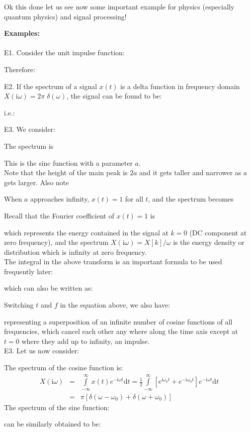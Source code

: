 	Ok this done let us see now some important example for physics (especially quantum physics) and signal processing!
	\begin{tcolorbox}[colframe=black,colback=white,sharp corners]
	\textbf{{\Large {}}Examples:}\\\\
	E1. Consider the unit impulse function:
	
	Therefore:
	
	E2. If the spectrum of a signal $x(t)$ is a delta function in frequency domain $X(\mathrm{i}\omega)=2\pi\;\delta(\omega)$, the signal can be found to be:
	
	i.e.:
	
	E3. We consider:
	
	The spectrum is
	
	This is the sinc function with a parameter $a$.\\
	
	Note that the height of the main peak is $2a$ and it gets taller and narrower as
	$a$ gets larger. Also note 
	
	When $a$ approaches infinity, $x(t)=1$ for all $t$, and the spectrum becomes
		
	\end{tcolorbox}
	
	
	\begin{tcolorbox}[colframe=black,colback=white,sharp corners]
	Recall that the Fourier coefficient of $x(t)=1$ is
	
	which represents the energy contained in the signal at $k=0$ (DC component at zero frequency), and the spectrum $X(\mathrm{i}\omega)=X[k]/\omega$ is the energy density or distribution which is infinity at zero frequency.\\
	
	The integral in the above transform is an important formula to be used frequently later:
	
	which can also be written as:
	
	Switching $t$ and $f$ in the equation above, we also have:
	
	representing a superposition of an infinite number of cosine functions of all
	frequencies, which cancel each other any where along the time axis except at
	$t=0$ where they add up to infinity, an impulse. \\
	
	E3. Let us now consider:
	
	The spectrum of the cosine function is:
	\begin{eqnarray}
		X(\mathrm{i}\omega) &=& \int\limits_{-\infty}^{\infty} x(t)e^{-\mathrm{i}\omega t} \mathrm{d}t   
		=\frac{1}{2}\int\limits_{-\infty}^{\infty}
		[e^{\mathrm{i}\omega_0t}+e^{-\mathrm{i}\omega_0t}]e^{-\mathrm{i}\omega t} \mathrm{d}t   
		\nonumber \\
	 &=& \pi [\delta(\omega-\omega_0)+\delta(\omega+\omega_0)]
		\nonumber
	\end{eqnarray}
	The spectrum of the sine function:
	
	can be similarly obtained to be:
		
	\end{tcolorbox}
	
